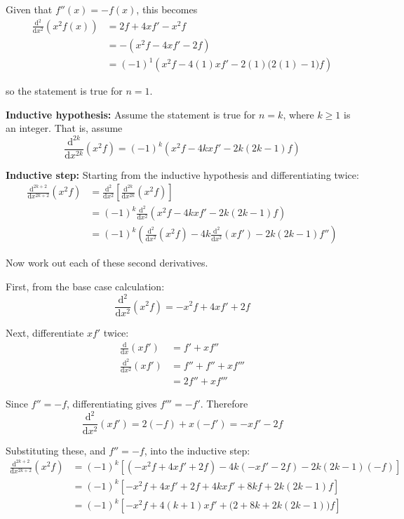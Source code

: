\documentclass[leqno]{article}
\begin{document}
\begin{enumerate}[
  label=\textbf{\arabic*.},
  leftmargin=*,
  topsep=0pt,
  partopsep=0pt,
  parsep=0pt
]
\begin{djsSolution}
Given that \(f''(x)=-f(x)\), this becomes
\begin{align*}
\frac{\mathrm{d}^2}{\mathrm{d}x^2}\left(x^2f(x)\right)
&=2f+4xf'-x^2f
\\
&=-(x^2f-4xf'-2f)
\\
&=(-1)^1\left(x^2f-4(1)xf'-2(1)\bigl(2(1)-1\bigr)f\right)
\end{align*}

so the statement is true for \(n=1\).

\textbf{Inductive hypothesis:} Assume the statement is true for \(n=k\), where \(k\ge 1\) is an integer. That is, assume
\[
\frac{\mathrm{d}^{2k}}{\mathrm{d}x^{2k}}\left(x^2f\right)
= (-1)^k\left(x^2f-4kxf'-2k(2k-1)f\right)
\]

\textbf{Inductive step:} Starting from the inductive hypothesis and differentiating twice:
\begin{align*}
\frac{\mathrm{d}^{2k+2}}{\mathrm{d}x^{2k+2}}\left(x^2f\right)
&= \frac{\mathrm{d}^2}{\mathrm{d}x^2}\left[\frac{\mathrm{d}^{2k}}{\mathrm{d}x^{2k}}(x^2f)\right]
\\
&= (-1)^k\frac{\mathrm{d}^2}{\mathrm{d}x^2}\left(x^2f-4kxf'-2k(2k-1)f\right)
\\
&= (-1)^k\left(\frac{\mathrm{d}^2}{\mathrm{d}x^2}(x^2f)-4k\frac{\mathrm{d}^2}{\mathrm{d}x^2}(xf')-2k(2k-1)f''\right)
\end{align*}

Now work out each of these second derivatives.

First, from the base case calculation:
\[
\frac{\mathrm{d}^2}{\mathrm{d}x^2}(x^2f)=-x^2f+4xf'+2f
\]

Next, differentiate \(xf'\) twice:
\begin{align*}
\frac{\mathrm{d}}{\mathrm{d}x}(xf')
&=f'+xf''
\\
\frac{\mathrm{d}^2}{\mathrm{d}x^2}(xf')
&=f''+f''+xf'''
\\
&=2f''+xf'''
\end{align*}

Since \(f''=-f\), differentiating gives \(f'''=-f'\). Therefore
\[
\frac{\mathrm{d}^2}{\mathrm{d}x^2}(xf')=2(-f)+x(-f')=-xf'-2f
\]

Substituting these, and \(f''=-f\), into the inductive step:
\begin{align*}
\frac{\mathrm{d}^{2k+2}}{\mathrm{d}x^{2k+2}}\left(x^2f\right)
&= (-1)^k\left[(-x^2f+4xf'+2f)-4k(-xf'-2f)-2k(2k-1)(-f)\right]
\\
&= (-1)^k\left[-x^2f+4xf'+2f+4kxf'+8kf+2k(2k-1)f\right]
\\
&= (-1)^k\left[-x^2f+4(k+1)xf'+\bigl(2+8k+2k(2k-1)\bigr)f\right]
\end{align*}


\end{djsSolution}
\end{enumerate}
\end{document}
